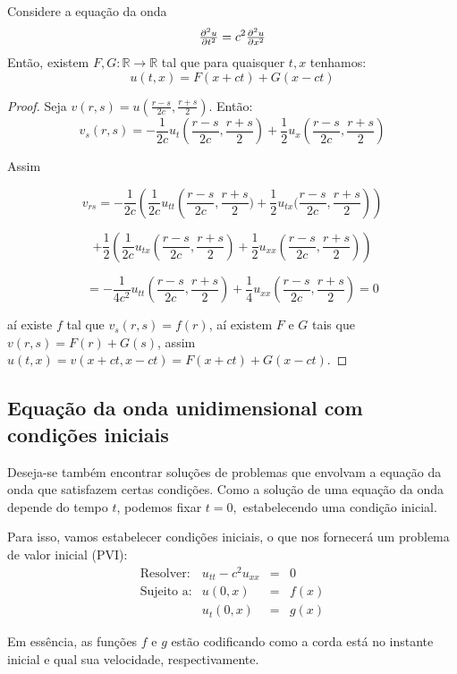 \documentclass[11pt,twoside,a4paper]{book}
\begin{document}
\begin{proposicao}
Considere a equação da onda 
\[
\pd[2]{u}{t} = c^2 \pd[2]{u}{x}
\]
Então, existem $F, G \colon \mathbb{R} \to \mathbb{R}$ tal que para quaisquer $t,x$ tenhamos:
\[
u(t,x) = F(x + ct) + G(x - ct)
\]

\end{proposicao}
\begin{proof}
Seja $v(r,s)=u\left(\frac{r-s}{2c},\frac{r+s}{2}\right)$. Então: \[
v_s(r,s)=-\frac{1}{2c}u_t\left(\frac{r-s}{2c},\frac{r+s}{2}\right)+\frac{1}{2}u_x\left(\frac{r-s}{2c},\frac{r+s}{2}\right)
\]

\noindent
Assim 

\[
v_{rs}=-\frac{1}{2c}\left(\frac{1}{2c}u_{tt}\left(\frac{r-s}{2c},\frac{r+s}{2})+\frac{1}{2}u_{tx}(\frac{r-s}{2c},\frac{r+s}{2}\right)\right)
\]

\[
+\frac{1}{2}\left(\frac{1}{2c}u_{tx}\left(\frac{r-s}{2c},\frac{r+s}{2}\right)+\frac{1}{2}u_{xx}\left(\frac{r-s}{2c},\frac{r+s}{2}\right)\right)
\]

\[
=-\frac{1}{4c^2}u_{tt}\left(\frac{r-s}{2c},\frac{r+s}{2}\right)+\frac{1}{4}u_{xx}\left(\frac{r-s}{2c},\frac{r+s}{2}\right)=0
\]

\noindent
aí existe $f$ tal que $v_s(r,s)=f(r)$, aí existem $F$ e $G$ tais que $v(r,s)=F(r)+G(s)$, assim $u(t,x)=v(x+ct,x-ct)=F(x+ct)+G(x-ct)$.
\end{proof}

\subsection{Equação da onda unidimensional com condições iniciais}

\noindent
Deseja-se também encontrar soluções de problemas que envolvam a equação da onda que satisfazem certas condições. Como a solução de uma equação da onda depende do tempo $t$, podemos fixar $t = 0,$ estabelecendo uma condição inicial.

\medskip
\noindent
Para isso, vamos estabelecer condições iniciais, o que nos fornecerá um problema de valor inicial (PVI):
\[\begin{array}{cccc}
     \text{Resolver:} & u_{tt} - c^2 u_{xx} & = & 0  \\
     \text{Sujeito a:} & u(0,x) & = & f(x) \\
      & u_t (0,x) & = & g(x)
\end{array}\]

\noindent
Em essência, as funções $f$ e $g$ estão codificando como a corda está no instante inicial e qual sua velocidade, respectivamente.
\end{document}
